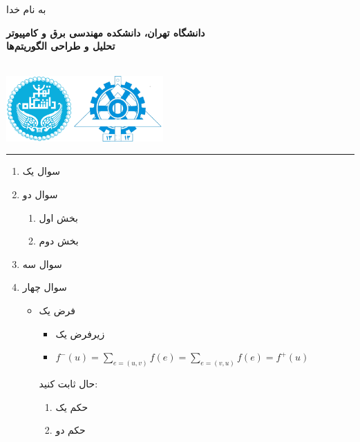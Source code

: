 \documentclass{article}
\date{}
\def\vstrut#1{\rule{0pt}{#1}}
\def\nothing{\vstrut{0pt}}
\begin{document}
\begin{center}
{به نام خدا}
\end{center}

\hspace{8mm}

{\noindent \Large \textbf {
دانشگاه تهران، دانشکده مهندسی برق و کامپیوتر \\
تحلیل و طراحی الگوریتم‌ها \\
}}

{}

\begin{flushleft}
\nothing \\[-3.2cm]
\includegraphics[height=2.5cm]{../../../static/pics/ut-eng.png}
\end{flushleft}

\rule{\textwidth}{1pt}


\begin{enumerate}
\item
سوال یک

\item
سوال دو
\begin{enumerate}
\item
بخش اول

\item
بخش دوم
\end{enumerate}

\item
سوال سه

\item
سوال چهار
\begin{itemize}
\item
فرض یک
\begin{itemize}
\item 
زیرفرض یک
\item
$f^-(u)=\sum_{e=(u,v)}f(e) = \sum_{e=(v,u)} f(e)=f^+(u)$

\end{itemize}  
 حال ثابت کنید:
 \begin{enumerate}
 \item
حکم یک
 
 \item
حکم دو
 
 \end{enumerate} 
 
\end{itemize}

\end{enumerate}
\end{document}
